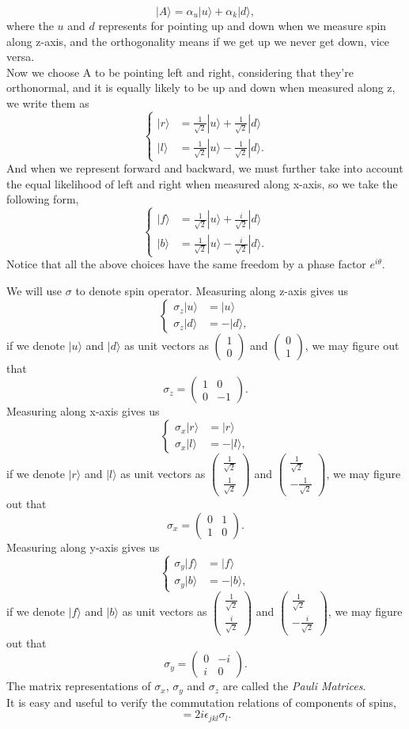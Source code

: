 \documentclass{article}
\newcommand{\be}{\begin{equation}}
\newcommand{\ee}{\end{equation}}
\newcommand{\ba}{\begin{array}}
\newcommand{\ea}{\end{array}}
\renewcommand{\1}{\left}
\renewcommand{\2}{\right}
\newcommand{\ra}{\rangle}
\newcommand{\al}{\alpha}
\newcommand{\sig}{\sigma}
\newcommand{\ep}{\epsilon}
\begin{document}
\be
|A\ra=\al_u|u\ra+\al_k|d\ra,
\ee
where the $u$ and $d$ represents for pointing up and down when we measure spin along z-axis, and the orthogonality means if we get up we never get down, vice versa.\\
Now we choose A to be pointing left and right, considering that they're orthonormal, and it is equally likely to be up and down when measured along z, we write them as
\be\1\{\begin{split}
|r\ra&=\frac1 {\sqrt{2}}|u\ra+\frac1 {\sqrt{2}}|d\ra\\
|l\ra&=\frac1 {\sqrt{2}}|u\ra- \frac1 {\sqrt{2}}|d\ra.
\end{split}\2.\ee
And when we represent forward and backward, we must further take into account the equal likelihood of left and right when measured along x-axis, so we take the following form,
\be\1\{\begin{split}
|f\ra&=\frac1 {\sqrt{2}}|u\ra+\frac i {\sqrt{2}}|d\ra\\
|b\ra&=\frac1 {\sqrt{2}}|u\ra- \frac i {\sqrt{2}}|d\ra.
\end{split}\2.\ee
Notice that all the above choices have the same freedom by a phase factor $e^{i\theta}$.

We will use $\sig$ to denote spin operator. Measuring along z-axis gives us
\be\1\{\begin{split}
\sig_z |u\ra&=|u\ra\\
\sig_z |d\ra&=-|d\ra,
\end{split}\2.\ee
if we denote $|u\ra$ and $|d\ra$ as unit vectors as $\1(\ba{c}1\\0\ea\2)$ and $\1(\ba{c}0\\1\ea\2)$, we may figure out that
\be
\sig_z=\1(\ba{cc}1&0\\0&-1\ea\2).
\ee
Measuring along x-axis gives us
\be\1\{\begin{split}
\sig_x |r\ra&=|r\ra\\
\sig_x |l\ra&=-|l\ra,
\end{split}\2.\ee
if we denote $|r\ra$ and $|l\ra$ as unit vectors as $\1(\ba{c}\frac1{\sqrt{2}}\\\frac1{\sqrt{2}}\ea\2)$ and $\1(\ba{c}\frac1{\sqrt{2}}\\-\frac1{\sqrt{2}}\ea\2)$, we may figure out that
\be
\sig_x=\1(\ba{cc}0&1\\1&0\ea\2).
\ee
Measuring along y-axis gives us
\be\1\{\begin{split}
\sig_y |f\ra&=|f\ra\\
\sig_y |b\ra&=-|b\ra,
\end{split}\2.\ee
if we denote $|f\ra$ and $|b\ra$ as unit vectors as $\1(\ba{c}\frac1{\sqrt{2}}\\\frac i{\sqrt{2}}\ea\2)$ and $\1(\ba{c}\frac1{\sqrt{2}}\\-\frac i{\sqrt{2}}\ea\2)$, we may figure out that
\be
\sig_y=\1(\ba{cc}0&-i\\i&0\ea\2).
\ee
The matrix representations of $\sig_x$, $\sig_y$ and $\sig_z$ are called the \textit{Pauli Matrices}.\\
It is easy and useful to verify the commutation relations of components of spins,
\be
[\sig_j,\sig_k]=2i\ep_{jkl}\sig_l.
\ee
\end{document}
